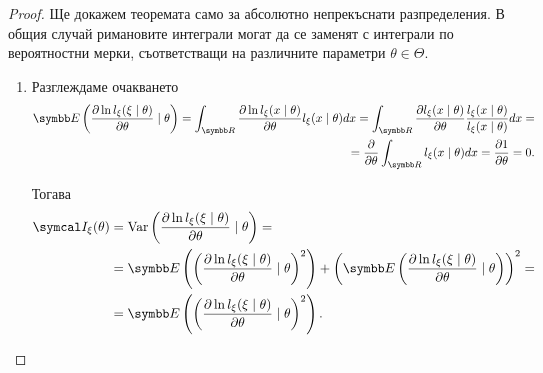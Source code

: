 \documentclass[numbers=endperiod, bibliography=totocnumbered]{scrartcl}
\begin{document}
\begin{proof}
  Ще докажем теоремата само за абсолютно непрекъснати разпределения. В общия случай римановите интеграли могат да се заменят с интеграли по вероятностни мерки, съответстващи на различните параметри \( \theta \in \Theta \).
  \begin{enumerate}
    \item Разглеждаме очакването
    \begin{align*}
      \Expect\left( \frac {\partial \ln l_\xi(\xi \mid \theta)} {\partial \theta} \mid \theta \right)
      =
      \int_{\R} \frac {\partial \ln l_\xi(x \mid \theta)} {\partial \theta} l_\xi(x \mid \theta) dx
      =
      \int_{\R} \frac {\partial l_\xi(x \mid \theta)} {\partial \theta} \frac {l_\xi(x \mid \theta)} {l_\xi(x \mid \theta)} dx
      = \\ =
      \frac \partial {\partial \theta} \int_{\R} l_\xi(x \mid \theta) dx
      =
      \frac {\partial 1} {\partial \theta}
      =
      0.
    \end{align*}

    Тогава
    \begin{align*}
      \FisherInfo_\xi(\theta)
      &=
      \Var\left( \frac {\partial \ln l_\xi(\xi \mid \theta)} {\partial \theta} \mid \theta \right)
      = \\ &=
      \Expect\left( {\left( \frac {\partial \ln l_\xi(\xi \mid \theta)} {\partial \theta} \mid \theta \right)}^2 \right) + {\left(\Expect\left( \frac {\partial \ln l_\xi(\xi \mid \theta)} {\partial \theta} \mid \theta \right)\right)}^2
      = \\ &=
      \Expect\left( {\left( \frac {\partial \ln l_\xi(\xi \mid \theta)} {\partial \theta} \mid \theta \right)}^2 \right).
    \end{align*}


\end{enumerate}
\end{proof}
\end{document}
